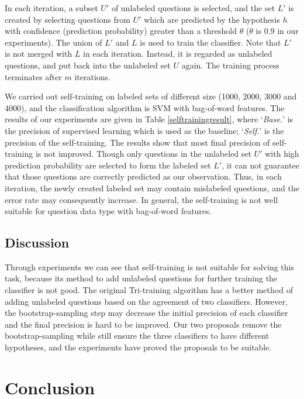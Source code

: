 \documentclass[english]{jnlp_1.4}
\begin{document}
In each iteration, a subset $U'$ of unlabeled questions is selected, and the set $L'$ is created by selecting questions from $U'$ which are predicted by the hypothesis $h$ with confidence (prediction probability) greater than a threshold $\theta$ ($\theta$ is 0.9 in our experiments). The union of $L'$ and $L$ is used to train the classifier. Note that $L'$ is not merged with $L$ in each iteration. Instead, it is regarded as unlabeled questions, and put back into the unlabeled set $U$ again. The training process terminates after $m$ iterations.




We carried out self-training on labeled sets of different size
(1000, 2000, 3000 and 4000), and the classification algorithm is
SVM with bag-of-word features. The results of our experiments are
given in Table \ref{selftrainingresult}, where `\textit{Base.}' is
the precision of supervised learning which is used as the
baseline; `\textit{Self.}' is the precision of the self-training.
The results show that most final precision of self-training is not
improved. Though only questions in the unlabeled set $U'$ with
high prediction probability are selected to form the labeled set
$L'$, it can not guarantee that those questions are correctly
predicted as our observation. Thus, in each iteration, the newly
created labeled set may contain mislabeled questions, and the
error rate may consequently increase. In general, the
self-training is not well suitable for question data type with
bag-of-word features.



\subsection{Discussion}

Through experiments we can see that self-training is not suitable
for solving this task, because its method to add unlabeled
questions for further training the classifier is not good. The
original Tri-training algorithm has a better method of adding
unlabeled questions based on the agreement of two classifiers.
However, the bootstrap-sampling step may decrease the initial
precision of each classifier and the final precision is hard to be
improved.  Our two proposals remove the bootstrap-sampling while
still ensure the three classifiers to have different hypotheses,
and the experiments have proved the proposals to be suitable.



\section{Conclusion}
\end{document}
